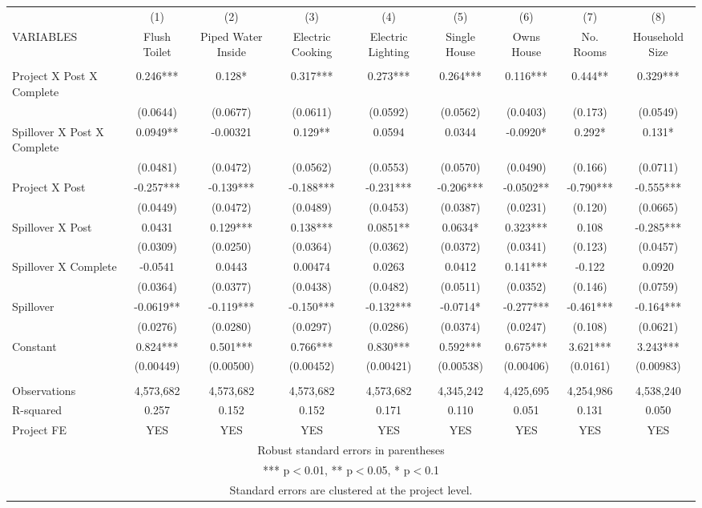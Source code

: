 \begin{tabular}{lcccccccc} \hline
 & (1) & (2) & (3) & (4) & (5) & (6) & (7) & (8) \\
VARIABLES & Flush Toilet & Piped Water Inside & Electric Cooking & Electric Lighting & Single House & Owns House & No. Rooms & Household Size \\ \hline
 &  &  &  &  &  &  &  &  \\
Project X Post X Complete & 0.246*** & 0.128* & 0.317*** & 0.273*** & 0.264*** & 0.116*** & 0.444** & 0.329*** \\
 & (0.0644) & (0.0677) & (0.0611) & (0.0592) & (0.0562) & (0.0403) & (0.173) & (0.0549) \\
Spillover X Post X Complete & 0.0949** & -0.00321 & 0.129** & 0.0594 & 0.0344 & -0.0920* & 0.292* & 0.131* \\
 & (0.0481) & (0.0472) & (0.0562) & (0.0553) & (0.0570) & (0.0490) & (0.166) & (0.0711) \\
Project X Post & -0.257*** & -0.139*** & -0.188*** & -0.231*** & -0.206*** & -0.0502** & -0.790*** & -0.555*** \\
 & (0.0449) & (0.0472) & (0.0489) & (0.0453) & (0.0387) & (0.0231) & (0.120) & (0.0665) \\
Spillover X Post & 0.0431 & 0.129*** & 0.138*** & 0.0851** & 0.0634* & 0.323*** & 0.108 & -0.285*** \\
 & (0.0309) & (0.0250) & (0.0364) & (0.0362) & (0.0372) & (0.0341) & (0.123) & (0.0457) \\
Spillover X Complete & -0.0541 & 0.0443 & 0.00474 & 0.0263 & 0.0412 & 0.141*** & -0.122 & 0.0920 \\
 & (0.0364) & (0.0377) & (0.0438) & (0.0482) & (0.0511) & (0.0352) & (0.146) & (0.0759) \\
Spillover & -0.0619** & -0.119*** & -0.150*** & -0.132*** & -0.0714* & -0.277*** & -0.461*** & -0.164*** \\
 & (0.0276) & (0.0280) & (0.0297) & (0.0286) & (0.0374) & (0.0247) & (0.108) & (0.0621) \\
Constant & 0.824*** & 0.501*** & 0.766*** & 0.830*** & 0.592*** & 0.675*** & 3.621*** & 3.243*** \\
 & (0.00449) & (0.00500) & (0.00452) & (0.00421) & (0.00538) & (0.00406) & (0.0161) & (0.00983) \\
 &  &  &  &  &  &  &  &  \\
Observations & 4,573,682 & 4,573,682 & 4,573,682 & 4,573,682 & 4,345,242 & 4,425,695 & 4,254,986 & 4,538,240 \\
R-squared & 0.257 & 0.152 & 0.152 & 0.171 & 0.110 & 0.051 & 0.131 & 0.050 \\
 Project FE & YES & YES & YES & YES & YES & YES & YES & YES \\ \hline
\multicolumn{9}{c}{ Robust standard errors in parentheses} \\
\multicolumn{9}{c}{ *** p$<$0.01, ** p$<$0.05, * p$<$0.1} \\
\multicolumn{9}{c}{ Standard errors are clustered at the project level.} \\
\end{tabular}
